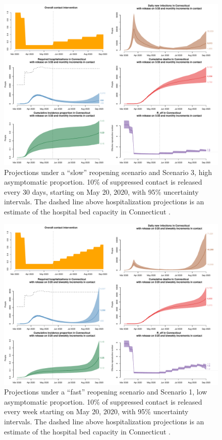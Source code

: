 \documentclass[11pt]{article}
\begin{document}
\begin{figure} %
	\centering
	\includegraphics[width=.9\textwidth]{figures/slow_high_full.pdf}
	\caption{Projections under a ``slow'' reopening scenario and Scenario 3, high asymptomatic proportion. 10\% of suppressed contact is released every 30 days, starting on May 20, 2020, with 95\% uncertainty intervals. The dashed line above hospitalization projections is an estimate of the hospital bed capacity in Connecticut \citep{CHAwebsite}. }
	\label{fig:slow_high}
\end{figure}


\begin{figure} %
	\centering
	\includegraphics[width=.9\textwidth]{figures/fast_low_full.pdf}
	\caption{Projections under a ``fast'' reopening scenario and Scenario 1, low asymptomatic proportion. 10\% of suppressed contact is released every week starting on May 20, 2020, with 95\% uncertainty intervals. The dashed line above hospitalization projections is an estimate of the hospital bed capacity in Connecticut \citep{CHAwebsite}. }
	\label{fig:fast_low}
\end{figure}
\end{document}
